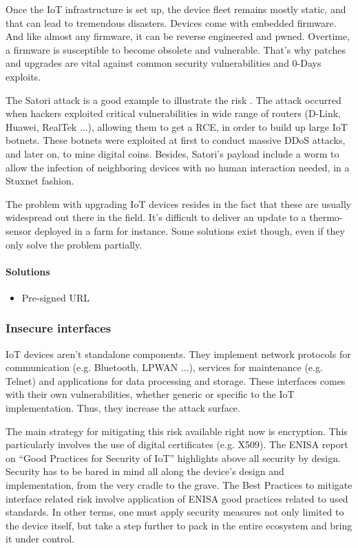 Once the IoT infrastructure is set up, the device fleet remains mostly static, and that can lead to tremendous disasters. Devices come with embedded firmware. And like almost any firmware, it can be reverse engineered and pwned. Overtime, a firmware is susceptible to become obsolete and vulnerable. That’s why patches and upgrades are vital against common security vulnerabilities and 0-Days exploits.

The Satori attack is a good example to illustrate the risk \cite{arstechnica}. The attack occurred when hackers exploited critical vulnerabilities in wide range of routers (D-Link, Huawei, RealTek ...), allowing them to get a RCE, in order to build up large IoT botnets. These botnets were exploited at first to conduct massive DDoS attacks, and later on, to mine digital coins. Besides, Satori’s payload include a worm to allow the infection of neighboring devices with no human interaction needed, in a Stuxnet fashion.

The problem with upgrading IoT devices resides in the fact that these are usually widespread out there in the field. It’s difficult to deliver an update to a thermo-sensor deployed in a farm for instance. Some solutions exist though, even if they only solve the problem partially.

\paragraph{Solutions}

\begin{itemize}
	\item Pre-signed URL
\end{itemize}


\subsubsection{Insecure interfaces}

IoT devices aren’t standalone components. They implement network protocols for communication (e.g. Bluetooth, LPWAN ...), services for maintenance (e.g. Telnet) and applications for data processing and storage. These interfaces comes with their own vulnerabilities, whether generic or specific to the IoT implementation. Thus, they increase the attack surface.

The main strategy for mitigating this risk available right now is encryption. This particularly involves the use of digital certificates (e.g. X509). The ENISA report on “Good Practices for Security of IoT” \cite{enisa} highlights above all security by design. Security has to be bared in mind all along the device’s design and implementation, from the very cradle to the grave. The Best Practices to mitigate interface related risk involve application of ENISA good practices related to used standards. In other terms, one must apply security measures not only limited to the device itself, but take a step further to pack in the entire ecosystem and bring it under control.

